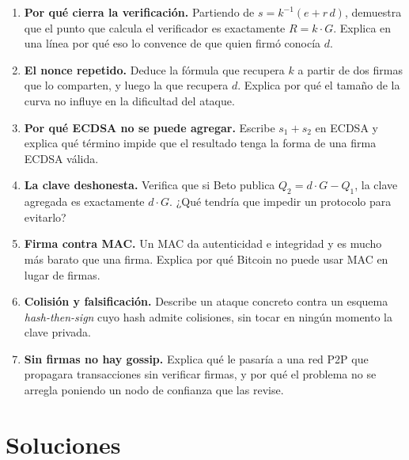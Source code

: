 \documentclass[11pt,a4paper]{article}
\theoremstyle{definition}
\theoremstyle{plain}
\theoremstyle{remark}
\begin{document}
\begin{enumerate}[leftmargin=1.8em,itemsep=0.8em]

\item\label{e:verif} \textbf{Por qué cierra la verificación.}
Partiendo de $s = k^{-1}(e + r\,d)$, demuestra que el punto que calcula el
verificador es exactamente $R = k\cdot G$. Explica en una línea por qué eso lo
convence de que quien firmó conocía $d$.

\item\label{e:nonce} \textbf{El nonce repetido.}
Deduce la fórmula que recupera $k$ a partir de dos firmas que lo comparten, y
luego la que recupera $d$. Explica por qué el tamaño de la curva no influye en la
dificultad del ataque.

\item\label{e:agregar} \textbf{Por qué ECDSA no se puede agregar.}
Escribe $s_1 + s_2$ en ECDSA y explica qué término impide que el resultado tenga
la forma de una firma ECDSA válida.

\item\label{e:rogue} \textbf{La clave deshonesta.}
Verifica que si Beto publica $Q_2 = d\cdot G - Q_1$, la clave agregada es
exactamente $d\cdot G$. ¿Qué tendría que impedir un protocolo para evitarlo?

\item\label{e:mac} \textbf{Firma contra MAC.}
Un MAC da autenticidad e integridad y es mucho más barato que una firma. Explica
por qué Bitcoin no puede usar MAC en lugar de firmas.

\item\label{e:colision} \textbf{Colisión y falsificación.}
Describe un ataque concreto contra un esquema \emph{hash-then-sign} cuyo hash
admite colisiones, sin tocar en ningún momento la clave privada.

\item\label{e:gossip} \textbf{Sin firmas no hay gossip.}
Explica qué le pasaría a una red P2P que propagara transacciones sin verificar
firmas, y por qué el problema no se arregla poniendo un nodo de confianza que las
revise.

\end{enumerate}

\appendix
\section{Soluciones}\label{app:sol}
\end{document}
